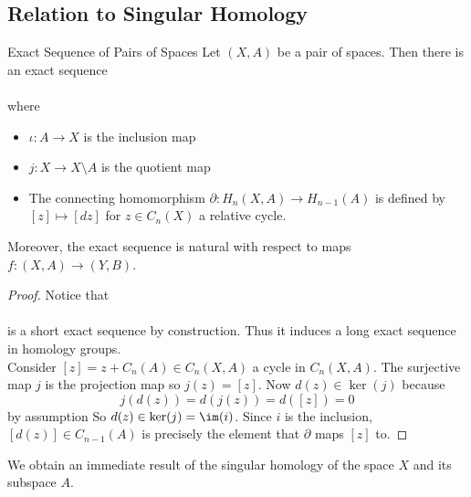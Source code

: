 \documentclass[a4paper]{article}
\begin{document}
\subsection{Relation to Singular Homology}
\begin{thm}{Exact Sequence of Pairs of Spaces}{} Let $(X,A)$ be a pair of spaces. Then there is an exact sequence \\
\\
where 
\begin{itemize}
\item $\iota:A\to X$ is the inclusion map
\item $j:X\to X\setminus A$ is the quotient map
\item The connecting homomorphism $\partial:H_n(X,A)\to H_{n-1}(A)$ is defined by $[z]\mapsto[dz]$ for $z\in C_n(X)$ a relative cycle. 
\end{itemize}
Moreover, the exact sequence is natural with respect to maps $f:(X,A)\to(Y,B)$. 
\begin{proof}
Notice that \\
\\
is a short exact sequence by construction. Thus it induces a long exact sequence in homology groups. \\

Consider $[z]=z+C_n(A)\in C_n(X,A)$ a cycle in $C_n(X,A)$. The surjective map $j$ is the projection map so $j(z)=[z]$. Now $d(z)\in\ker(j)$ because $$j(d(z))=d(j(z))=d([z])=0$$ by assumption So $d(z)\in\ker(j)=\im(i)$. Since $i$ is the inclusion, $[d(z)]\in C_{n-1}(A)$ is precisely the element that $\partial$ maps $[z]$ to. 
\end{proof}
\end{thm}

We obtain an immediate result of the singular homology of the space $X$ and its subspace $A$. 
\end{document}
